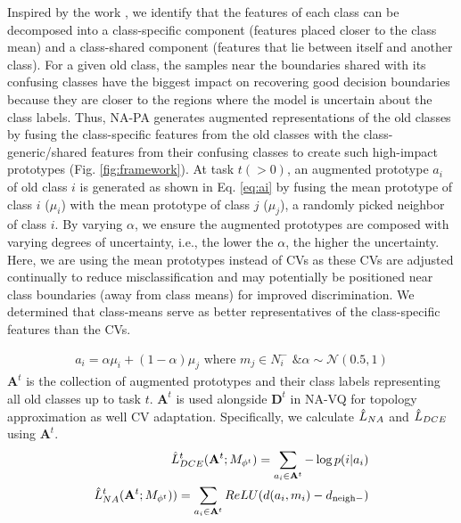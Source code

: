 \documentclass[10pt,twocolumn,letterpaper]{article}
\begin{document}
Inspired by the work \cite{Chu2020FeatureData}, we identify that the features of each class can be decomposed into a class-specific component (features placed closer to the class mean) and a class-shared component (features that lie between itself and another class). For a given old class, the samples near the boundaries shared with its confusing classes have the biggest impact on recovering good decision boundaries because they are closer to the regions where the model is uncertain about the class labels. Thus, NA-PA generates augmented representations of the old classes by fusing the class-specific features from the old classes with the class-generic/shared features from their confusing classes to create such high-impact prototypes (Fig. \ref{fig:framework}). 
At task $t(>0)$, an augmented prototype $a_i$ of old class $i$ is generated as shown in Eq. \ref{eq:ai} by fusing the mean prototype of class $i$ ($\mu_i$) with the mean prototype of class $j$  ($\mu_j$), a randomly picked neighbor of class $i$. By varying $\alpha$, we ensure the augmented prototypes are composed with varying degrees of uncertainty, i.e., the lower the $\alpha$, the higher the uncertainty. Here, we are using the mean prototypes instead of CVs as these CVs are adjusted continually to reduce misclassification and may potentially be positioned near class boundaries (away from class means) for improved discrimination. We determined that class-means serve as better representatives of the class-specific features than the CVs. 

\begin{align}
    a_i = \alpha \mu_i + (1-\alpha)\mu_j \text{ where } m_j\in N_{i}^- \text{ \& } \alpha \sim \mathcal{N}(0.5,1)
\label{eq:ai}
\end{align}
$\mathbf{A}^t$ is the collection of augmented prototypes and their class labels representing all old classes up to task $t$. 
$\mathbf{A}^t$ is used alongside $\mathbf{D}^t$ in NA-VQ for topology approximation as well CV adaptation. Specifically, we calculate $\Hat{L}_{NA}$ and $\Hat{L}_{DCE}$ using $\mathbf{A}^t$. 
\begin{eqnarray}
    \Hat{L}_{DCE}^t(\mathbf{A}^t; M_{\phi^t}) = \sum_{a_i \in \mathbf{A}^t}-\log p(i|a_i) 
\\
\Hat{L}_{NA}^t(\mathbf{A}^t; M_{\phi^t})) =  \sum_{a_i \in \mathbf{A}^t} ReLU(d(a_i,m_i)-d_{\mathrm{neigh}-})
\end{eqnarray}
\end{document}
